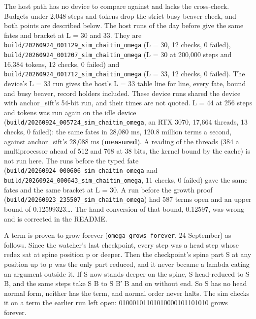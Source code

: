 The host path has no device to compare against and lacks the cross-check. Budgets under 2,048 steps and tokens drop the strict busy beaver check, and both points are described below. The host runs of the day before give the same fates and bracket at L = 30 and 33. They are \texttt{build/\allowbreak{}20260924\_\allowbreak{}001129\_\allowbreak{}sim\_\allowbreak{}chaitin\_\allowbreak{}omega} (L = 30, 12 checks, 0 failed), \texttt{build/\allowbreak{}20260924\_\allowbreak{}001207\_\allowbreak{}sim\_\allowbreak{}chaitin\_\allowbreak{}omega} (L = 30 at 200,000 steps and 16,384 tokens, 12 checks, 0 failed) and \texttt{build/\allowbreak{}20260924\_\allowbreak{}001712\_\allowbreak{}sim\_\allowbreak{}chaitin\_\allowbreak{}omega} (L = 33, 12 checks, 0 failed). The device's L = 33 run gives the host's L = 33 table line for line, every fate, bound and busy beaver, record holders included. These device runs shared the device with anchor\_\allowbreak{}sift's 54-bit run, and their times are not quoted. L = 44 at 256 steps and tokens was run again on the idle device (\texttt{build/\allowbreak{}20260924\_\allowbreak{}005724\_\allowbreak{}sim\_\allowbreak{}chaitin\_\allowbreak{}omega}, an RTX 3070, 17,664 threads, 13 checks, 0 failed): the same fates in 28,080 ms, 120.8 million terms a second, against anchor\_\allowbreak{}sift's 28,088 ms (\textbf{measured}). A reading of the threads (384 a multiprocessor ahead of 512 and 768 at 38 bits, the kernel bound by the cache) is not run here. The runs before the typed fate (\texttt{build/\allowbreak{}20260924\_\allowbreak{}000606\_\allowbreak{}sim\_\allowbreak{}chaitin\_\allowbreak{}omega} and \texttt{build/\allowbreak{}20260924\_\allowbreak{}000643\_\allowbreak{}sim\_\allowbreak{}chaitin\_\allowbreak{}omega}, 11 checks, 0 failed) gave the same fates and the same bracket at L = 30. A run before the growth proof (\texttt{build/\allowbreak{}20260923\_\allowbreak{}235507\_\allowbreak{}sim\_\allowbreak{}chaitin\_\allowbreak{}omega}) had 587 terms open and an upper bound of 0.12599323…. The hand conversion of that bound, 0.12597, was wrong and is corrected in the README.

A term is proven to grow forever (\texttt{omega\_\allowbreak{}grows\_\allowbreak{}forever}, 24 September) as follows. Since the watcher's last checkpoint, every step was a head step whose redex sat at spine position p or deeper. Then the checkpoint's spine part S at any position up to p was the only part reduced, and it never became a lambda eating an argument outside it. If S now stands deeper on the spine, S head-reduced to S B, and the same steps take S B to S B′ B and on without end. So S has no head normal form, neither has the term, and normal order never halts. The sim checks it on a term the earlier run left open: 01000101101010000101101010 grows forever.

